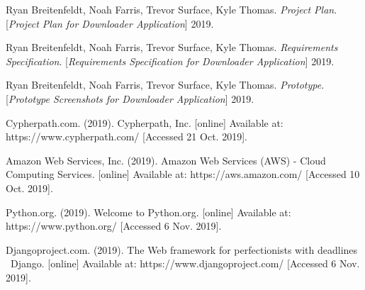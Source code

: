 \documentclass{article}
\begin{document}
\newpage
{}
    \begin{thebibliography}{7}
    Ryan Breitenfeldt, Noah Farris, Trevor Surface, Kyle Thomas.
    \textit{Project Plan}.
    [\textit{Project Plan for Downloader Application}] 2019.

    Ryan Breitenfeldt, Noah Farris, Trevor Surface, Kyle Thomas.
    \textit{Requirements Specification}.
    [\textit{Requirements Specification for Downloader Application}] 2019.

    Ryan Breitenfeldt, Noah Farris, Trevor Surface, Kyle Thomas.
    \textit{Prototype}.
    [\textit{Prototype Screenshots for Downloader Application}] 2019.


    Cypherpath.com. (2019). Cypherpath, Inc. [online] Available at: https://www.cypherpath.com/ [Accessed 21 Oct. 2019].

    Amazon Web Services, Inc. (2019). Amazon Web Services (AWS) - Cloud Computing Services. [online] Available at: https://aws.amazon.com/ [Accessed 10 Oct. 2019].


    Python.org. (2019). Welcome to Python.org. [online] Available at: https://www.python.org/ [Accessed 6 Nov. 2019].

    Djangoproject.com. (2019). The Web framework for perfectionists with deadlines \textbar\ Django. [online] Available at: https://www.djangoproject.com/ [Accessed 6 Nov. 2019].
    \end{thebibliography}

\end{document}
